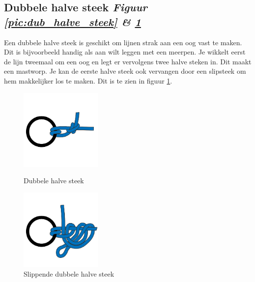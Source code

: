 \subsection{Dubbele halve steek \hfill \textit{Figuur \ref{pic:dub_halve_steek} \& \ref{pic:dub_slip_halve_steek}}}
Een dubbele halve steek is geschikt om lijnen strak aan een oog vast te maken. Dit is bijvoorbeeld handig als aan wilt leggen met een meerpen. Je wikkelt eerst de lijn tweemaal om een oog en legt er vervolgens twee halve steken in. Dit maakt een mastworp. Je kan de eerste halve steek ook vervangen door een slipsteek om hem makkelijker los te maken. Dit is te zien in figuur \ref{pic:dub_slip_halve_steek}.


\begin{figure}[h]
	\centering
	\begin{minipage}[b]{0.49\textwidth}
		\centering
		\includegraphics[height=4cm]{Hoofdstukken/Schiemannen/pdf/dubble_halve_steek.pdf}
		\caption{Dubbele halve steek}
		\label{pic:dub_halve_steek}
	\end{minipage}
	\hfill
	\begin{minipage}[b]{0.49\textwidth}
		\centering
		\includegraphics[height=4cm]{Hoofdstukken/Schiemannen/pdf/dubble_halve_steek_slippend.pdf}
		\caption{Slippende dubbele halve steek}
		\label{pic:dub_slip_halve_steek}
	\end{minipage}
	\hfill
\end{figure}
\newpage
